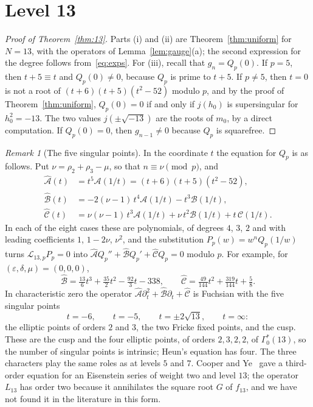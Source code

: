 \documentclass[11pt,a4paper]{article}
\theoremstyle{definition}
\theoremstyle{remark}
\newtheorem{remark}[theorem]{Remark}
\newcommand{\cL}{\mathcal{L}}
\newcommand{\cA}{\mathcal{A}}
\newcommand{\cB}{\mathcal{B}}
\newcommand{\cC}{\mathcal{C}}
\numberwithin{equation}{section}
\begin{document}
\section{Level 13}\label{sec:13}

\begin{proof}[Proof of Theorem~\ref{thm:13}]
Parts (i) and (ii) are Theorem~\ref{thm:uniform} for $N=13$, with the
operators of Lemma~\ref{lem:gauge}(a); the second expression for the degree
follows from~\eqref{eq:exps}. For (iii), recall that $g_n=Q_p(0)$. If $p=5$,
then $t+5\equiv t$ and $Q_p(0)\ne0$, because $Q_p$ is prime to $t+5$. If
$p\ne5$, then $t=0$ is not a root of $(t+6)(t+5)(t^2-52)$ modulo $p$, and by
the proof of Theorem~\ref{thm:uniform}, $Q_p(0)=0$ if and only if $j(h_0)$ is
supersingular for $h_0^2=-13$. The two values $j(\pm\sqrt{-13})$ are the roots
of $m_0$, by a direct computation. If $Q_p(0)=0$, then $g_{n-1}\ne0$ because
$Q_p$ is squarefree.
\end{proof}

\begin{remark}[The five singular points]\label{rem:five}
In the coordinate $t$ the equation for $Q_p$ is as follows. Put
$\nu=\rho_2+\rho_3-\mu$, so that $n\equiv\nu\pmod p$, and
\begin{align*}
 \widehat{\cA}(t)&=t^5\cA(1/t)=(t+6)(t+5)(t^2-52),\\
 \widehat{\cB}(t)&=-2(\nu-1)\,t^4\cA(1/t)-t^3\cB(1/t),\\
 \widehat{\cC}(t)&=\nu(\nu-1)\,t^3\cA(1/t)+\nu\,t^2\cB(1/t)+t\,\cC(1/t).
\end{align*}
In each of the eight cases these are polynomials, of degrees $4$, $3$, $2$ and
with leading coefficients $1$, $1-2\nu$, $\nu^2$, and the substitution
$P_p(w)=w^nQ_p(1/w)$ turns $\cL_{13,p}P_p=0$ into
$\widehat{\cA}Q_p''+\widehat{\cB}Q_p'+\widehat{\cC}Q_p=0$ modulo $p$. For
example, for $(\varepsilon,\delta,\mu)=(0,0,0)$,
\[
\widehat{\cB}=\tfrac{13}{6}t^3+\tfrac{35}{2}t^2-\tfrac{92}{3}t-338,\qquad
\widehat{\cC}=\tfrac{49}{144}t^2+\tfrac{319}{144}t+\tfrac58 .
\]
In characteristic zero the operator
$\widehat{\cA}\partial_t^2+\widehat{\cB}\partial_t+\widehat{\cC}$ is Fuchsian
with the five singular points
\[
 t=-6,\qquad t=-5,\qquad t=\pm2\sqrt{13},\qquad t=\infty :
\]
the elliptic points of orders $2$ and $3$, the two Fricke fixed points, and
the cusp. These are the cusp and the four elliptic points, of orders $2,3,2,2$, of
$\Gamma_0^*(13)$, so the number of singular points is intrinsic; Heun's
equation has four. The three characters play the same roles as at levels $5$
and $7$. Cooper and Ye~\cite{CooperYe} gave a third-order equation for an
Eisenstein series of weight two and level $13$; the operator $L_{13}$ has
order two because it annihilates the square root $G$ of $f_{13}$, and we have
not found it in the literature in this form.
\end{remark}
\end{document}
